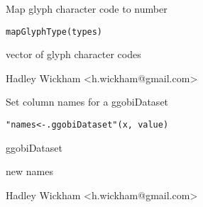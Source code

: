 \documentclass{article}
\begin{document}
\begin{Description}\relax
Map glyph character code to number
\end{Description}
\begin{Usage}
\begin{verbatim}mapGlyphType(types)\end{verbatim}
\end{Usage}
\begin{Arguments}
\begin{ldescription}
\item[\code{types}] vector of glyph character codes
\end{ldescription}
\end{Arguments}
\begin{Details}\relax
\end{Details}
\begin{Author}\relax
Hadley Wickham <h.wickham@gmail.com>
\end{Author}
\begin{Examples}
\begin{ExampleCode}\end{ExampleCode}
\end{Examples}

\begin{Description}\relax
Set column names for a ggobiDataset
\end{Description}
\begin{Usage}
\begin{verbatim}"names<-.ggobiDataset"(x, value)\end{verbatim}
\end{Usage}
\begin{Arguments}
\begin{ldescription}
\item[\code{x}] ggobiDataset
\item[\code{value}] new names
\end{ldescription}
\end{Arguments}
\begin{Details}\relax
\end{Details}
\begin{Author}\relax
Hadley Wickham <h.wickham@gmail.com>
\end{Author}
\begin{Examples}
\begin{ExampleCode}\end{ExampleCode}
\end{Examples}
\end{document}
